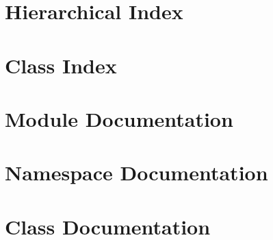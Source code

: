 \documentclass[letterpaper]{article}
\begin{document}
\section{Hierarchical Index}

\section{Class Index}

\section{Module Documentation}

\section{Namespace Documentation}


\section{Class Documentation}









































\printindex
\end{document}

